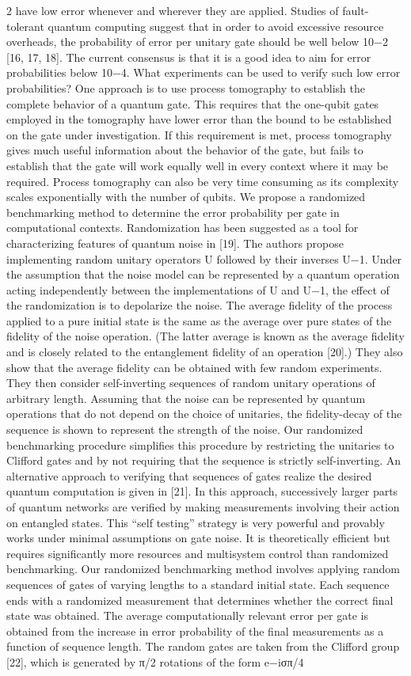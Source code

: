 2 have low error whenever and wherever they are applied. Studies of fault-tolerant quantum computing suggest that in order to avoid excessive resource overheads, the probability of error per unitary gate should be well below 10−2 [16, 17, 18]. The current consensus is that it is a good idea to aim for error probabilities below 10−4. What experiments can be used to verify such low error probabilities? One approach is to use process tomography to establish the complete behavior of a quantum gate. This requires that the one-qubit gates employed in the tomography have lower error than the bound to be established on the gate under investigation. If this requirement is met, process tomography gives much useful information about the behavior of the gate, but fails to establish that the gate will work equally well in every context where it may be required. Process tomography can also be very time consuming as its complexity scales exponentially with the number of qubits. We propose a randomized benchmarking method to determine the error probability per gate in computational contexts. Randomization has been suggested as a tool for characterizing features of quantum noise in [19]. The authors propose implementing random unitary operators U followed by their inverses U−1. Under the assumption that the noise model can be represented by a quantum operation acting independently between the implementations of U and U−1, the effect of the randomization is to depolarize the noise. The average fidelity of the process applied to a pure initial state is the same as the average over pure states of the fidelity of the noise operation. (The latter average is known as the average fidelity and is closely related to the entanglement fidelity of an operation [20].) They also show that the average fidelity can be obtained with few random experiments. They then consider self-inverting sequences of random unitary operations of arbitrary length. Assuming that the noise can be represented by quantum operations that do not depend on the choice of unitaries, the fidelity-decay of the sequence is shown to represent the strength of the noise. Our randomized benchmarking procedure simplifies this procedure by restricting the unitaries to Clifford gates and by not requiring that the sequence is strictly self-inverting. An alternative approach to verifying that sequences of gates realize the desired quantum computation is given in [21]. In this approach, successively larger parts of quantum networks are verified by making measurements involving their action on entangled states. This “self testing” strategy is very powerful and provably works under minimal assumptions on gate noise. It is theoretically efficient but requires significantly more resources and multisystem control than randomized benchmarking. Our randomized benchmarking method involves applying random sequences of gates of varying lengths to a standard initial state. Each sequence ends with a randomized measurement that determines whether the correct final state was obtained. The average computationally relevant error per gate is obtained from the increase in error probability of the final measurements as a function of sequence length. The random gates are taken from the Clifford group [22], which is generated by π/2 rotations of the form e−iσπ/4 